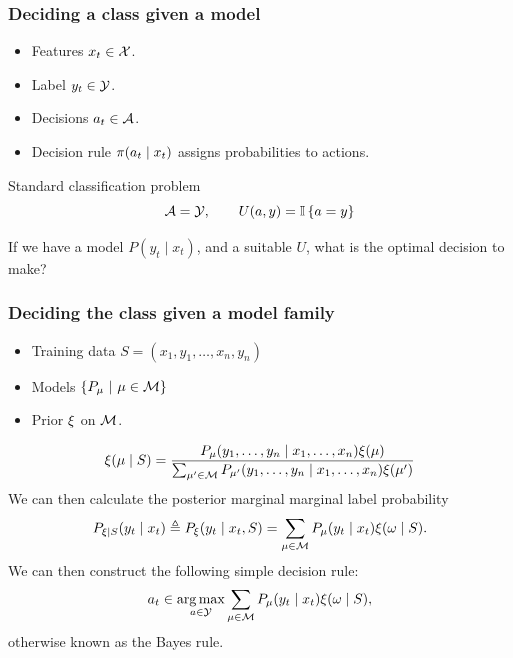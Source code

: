 \begin{frame}
  \frametitle{Deciding a class given a model}
  \begin{itemize}
  \item Features $x_t \in {\mathcal{X}}$.
  \item Label $y_t \in {\mathcal{Y}}$.
  \item Decisions $a_t \in {\mathcal{A}}$.
  \item Decision rule $\pi(a_t \mid x_t)$ assigns probabilities to actions.
  \end{itemize}
  
  \begin{block}{Standard classification problem}
    \[
      {\mathcal{A}} = {\mathcal{Y}}, \qquad
      U(a, y) = \mathop{\mbox{\ensuremath{\mathbb{I}}}}\left\{a = y\right\}
    \]
  \end{block}

  \begin{exercise}
    If we have a model $P(y_t \mid x_t)$, and a suitable $U$, what is the optimal decision to make?
  \end{exercise}
\end{frame}


\begin{frame}
  \frametitle{Deciding the class given a model family}
  \begin{itemize}
  \item Training data $S = (x_1, y_1, \ldots, x_n, y_n)$
  \item Models $\left\{P_\mu ~\middle|~ \mu \in {\mathcal{M}}\right\}$
  \item Prior $\xi$ on ${\mathcal{M}}$.
  \end{itemize}
  \[
    \xi(\mu \mid S)
    = \frac{P_\mu(y_1, \ldots, y_n \mid x_1, \ldots, x_n) \xi(\mu)}
    {\sum_{\mu' \in {\mathcal{M}}} P_{\mu'}(y_1, \ldots, y_n \mid x_1, \ldots, x_n) \xi(\mu')}
  \]
  We can then calculate the posterior marginal marginal label probability
  \[
    P_{\xi \mid S}(y_t \mid x_t) \mathrel{\triangleq}
    P_{\xi}(y_t \mid x_t, S) = 
    \sum_{\mu \in {\mathcal{M}}} P_\mu(y_t \mid x_t) \xi(\omega \mid S).
  \]
  We can then construct the following simple decision rule:
  \[
    a_t \in \mathop{\rm arg\,max}_{a \in {\mathcal{Y}}}\sum_{\mu \in {\mathcal{M}}} P_\mu(y_t \mid x_t) \xi(\omega \mid S),
  \]
  otherwise known as the \alert{Bayes rule}.
\end{frame}

